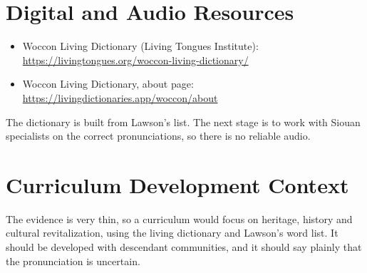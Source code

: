\documentclass[12pt]{article}
\begin{document}
\section{Digital and Audio Resources}
\begin{itemize}
\item Woccon Living Dictionary (Living Tongues Institute): \url{https://livingtongues.org/woccon-living-dictionary/}
\item Woccon Living Dictionary, about page: \url{https://livingdictionaries.app/woccon/about}
\end{itemize}
The dictionary is built from Lawson's list. The next stage is to work with Siouan specialists on the correct pronunciations, so there is no reliable audio.

\section{Curriculum Development Context}
The evidence is very thin, so a curriculum would focus on heritage, history and cultural revitalization, using the living dictionary and Lawson's word list. It should be developed with descendant communities, and it should say plainly that the pronunciation is uncertain.
\end{document}
